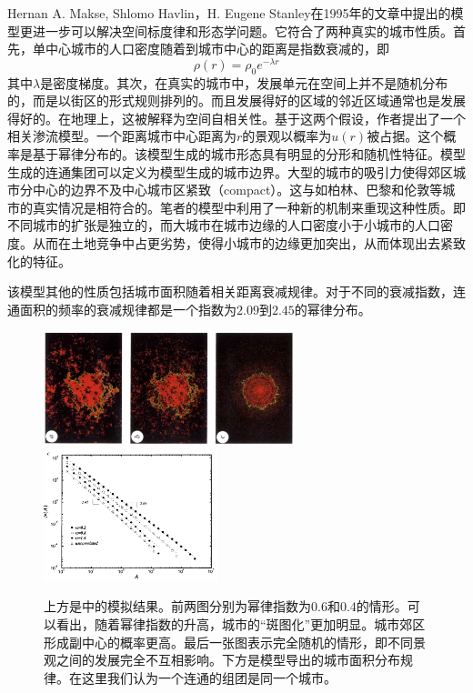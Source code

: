 Hernan A. Makse, Shlomo Havlin，H. Eugene Stanley在1995年的文章\cite{Makse1995}中提出的模型更进一步可以解决空间标度律和形态学问题。它符合了两种真实的城市性质。首先，单中心城市的人口密度随着到城市中心的距离是指数衰减的，即\[\rho(r)=\rho_0 e^{-\lambda r}\]其中$\lambda$是密度梯度。其次，在真实的城市中，发展单元在空间上并不是随机分布的，而是以街区的形式规则排列的。而且发展得好的区域的邻近区域通常也是发展得好的。在地理上，这被解释为空间自相关性。基于这两个假设，作者提出了一个相关渗流模型。一个距离城市中心距离为$r$的景观以概率为$u(r)$被占据。这个概率是基于幂律分布的。该模型生成的城市形态具有明显的分形和随机性特征。模型生成的连通集团可以定义为模型生成的城市边界。大型的城市的吸引力使得郊区城市分中心的边界不及中心城市区紧致（compact）。这与如柏林、巴黎和伦敦等城市的真实情况是相符合的\cite{Batty2006}。笔者的模型中利用了一种新的机制来重现这种性质。即不同城市的扩张是独立的，而大城市在城市边缘的人口密度小于小城市的人口密度。从而在土地竞争中占更劣势，使得小城市的边缘更加突出，从而体现出去紧致化的特征。

该模型其他的性质包括城市面积随着相关距离衰减规律。对于不同的衰减指数，连通面积的频率的衰减规律都是一个指数为$2.09$到$2.45$的幂律分布。
\begin{figure}
    \centering
    \includegraphics[width = 0.65\textwidth]{pictures/modellingurbanpattern.png}
    \includegraphics[width = 0.45\textwidth]{pictures/area_scaling.png}
    \caption{上方是\cite{Makse1995}中的模拟结果。前两图分别为幂律指数为$0.6$和$0.4$的情形。可以看出，随着幂律指数的升高，城市的“斑图化”更加明显。城市郊区形成副中心的概率更高。最后一张图表示完全随机的情形，即不同景观之间的发展完全不互相影响。下方是\cite{Makse1995}模型导出的城市面积分布规律。在这里我们认为一个连通的组团是同一个城市。}
\end{figure}

